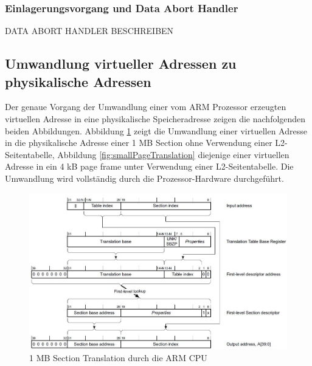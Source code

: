 \vspace{2cm}
\subsubsection{Einlagerungsvorgang und Data Abort Handler}
DATA ABORT HANDLER BESCHREIBEN
\vspace{2cm}

\subsection{Umwandlung virtueller Adressen zu physikalische Adressen}

Der genaue Vorgang der Umwandlung einer vom ARM Prozessor erzeugten virtuellen Adresse in eine physikalische Speicheradresse zeigen die nachfolgenden beiden Abbildungen. Abbildung  \ref{fig:sectionTranslation} zeigt die Umwandlung einer virtuellen Adresse in die physikalische Adresse einer 1 MB Section ohne Verwendung einer L2-Seitentabelle, Abbildung \ref{fig:smallPageTranslation} diejenige einer virtuellen Adresse in ein 4 kB page frame unter Verwendung einer L2-Seitentabelle.   Die Umwandlung wird vollständig durch die Prozessor-Hardware durchgeführt.\\


\begin{figure}[H]
	\includegraphics[scale=0.8]{chapters/mmu/figures/sectionTranslation}
	\caption{1 MB Section Translation durch die ARM CPU \cite[S. B3-1335]{ARM:ARM}}
	\label{fig:sectionTranslation}
\end{figure}

